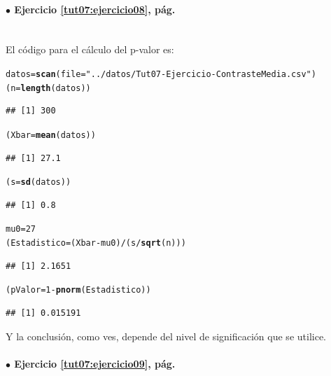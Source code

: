 \documentclass[10pt,a4paper]{article}\usepackage[]{graphicx}\usepackage[]{color}
\makeatletter
\newcommand{\hlnum}[1]{\textcolor[rgb]{0.686,0.059,0.569}{#1}}%
\newcommand{\hlstr}[1]{\textcolor[rgb]{0.192,0.494,0.8}{#1}}%
\newcommand{\hlopt}[1]{\textcolor[rgb]{0,0,0}{#1}}%
\newcommand{\hlstd}[1]{\textcolor[rgb]{0.345,0.345,0.345}{#1}}%
\newcommand{\hlkwb}[1]{\textcolor[rgb]{0.69,0.353,0.396}{#1}}%
\newcommand{\hlkwc}[1]{\textcolor[rgb]{0.333,0.667,0.333}{#1}}%
\newcommand{\hlkwd}[1]{\textcolor[rgb]{0.737,0.353,0.396}{\textbf{#1}}}%
\newenvironment{kframe}{%
 \def\at@end@of@kframe{}%
 \ifinner\ifhmode%
  \def\at@end@of@kframe{\end{minipage}}%
  \begin{minipage}{\columnwidth}%
 \fi\fi%
 \def\FrameCommand##1{\hskip\@totalleftmargin \hskip-\fboxsep
 \colorbox{shadecolor}{##1}\hskip-\fboxsep
     \hskip-\linewidth \hskip-\@totalleftmargin \hskip\columnwidth}%
 \MakeFramed {\advance\hsize-\width
   \@totalleftmargin\z@ \linewidth\hsize
   \@setminipage}}%
 {\par\unskip\endMakeFramed%
 \at@end@of@kframe}
\newenvironment{knitrout}{}{} %
\makeatother
\begin{document}
\paragraph{\bf $\bullet$ Ejercicio \ref{tut07:ejercicio08}, pág. \pageref{tut07:ejercicio08}}
\label{tut07:ejercicio08:sol}\quad\\

El código para el cálculo del p-valor es:
\begin{knitrout}
\color{fgcolor}\begin{kframe}
\begin{alltt}
\hlstd{datos} \hlkwb{=} \hlkwd{scan}\hlstd{(}\hlkwc{file} \hlstd{=} \hlstr{"../datos/Tut07-Ejercicio-ContrasteMedia.csv"}\hlstd{)}
\hlstd{(n} \hlkwb{=} \hlkwd{length}\hlstd{(datos))}
\end{alltt}
\begin{verbatim}
## [1] 300
\end{verbatim}
\begin{alltt}
\hlstd{(Xbar} \hlkwb{=} \hlkwd{mean}\hlstd{(datos))}
\end{alltt}
\begin{verbatim}
## [1] 27.1
\end{verbatim}
\begin{alltt}
\hlstd{(s} \hlkwb{=} \hlkwd{sd}\hlstd{(datos))}
\end{alltt}
\begin{verbatim}
## [1] 0.8
\end{verbatim}
\begin{alltt}
\hlstd{mu0} \hlkwb{=} \hlnum{27}
\hlstd{(Estadistico} \hlkwb{=} \hlstd{(Xbar} \hlopt{-} \hlstd{mu0)} \hlopt{/} \hlstd{(s} \hlopt{/} \hlkwd{sqrt}\hlstd{(n)))}
\end{alltt}
\begin{verbatim}
## [1] 2.1651
\end{verbatim}
\begin{alltt}
\hlstd{(pValor} \hlkwb{=} \hlnum{1} \hlopt{-} \hlkwd{pnorm}\hlstd{(Estadistico))}
\end{alltt}
\begin{verbatim}
## [1] 0.015191
\end{verbatim}
\end{kframe}
\end{knitrout}
Y la conclusión, como ves, depende del nivel de significación que se utilice.

\paragraph{\bf $\bullet$ Ejercicio \ref{tut07:ejercicio09}, pág. \pageref{tut07:ejercicio09}}
\label{tut07:ejercicio09:sol}\quad\\
\end{document}
